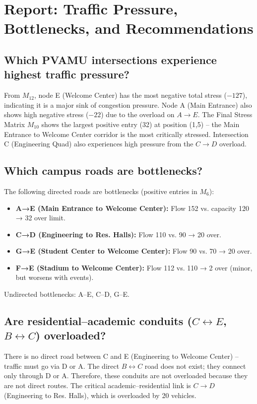 \documentclass{ximera}
\begin{document}
\newpage

\section*{Report: Traffic Pressure, Bottlenecks, and Recommendations}

\subsection*{Which PVAMU intersections experience highest traffic pressure?}
From \(M_{12}\), node E (Welcome Center) has the most negative total stress (\(-127\)), indicating it is a major sink of congestion pressure. Node A (Main Entrance) also shows high negative stress (\(-22\)) due to the overload on \(A\rightarrow E\). The Final Stress Matrix \(M_{10}\) shows the largest positive entry (32) at position (1,5) – the Main Entrance to Welcome Center corridor is the most critically stressed. Intersection C (Engineering Quad) also experiences high pressure from the \(C\rightarrow D\) overload.

\subsection*{Which campus roads are bottlenecks?}
The following directed roads are bottlenecks (positive entries in \(M_6\)):
\begin{itemize}
    \item \textbf{A→E (Main Entrance to Welcome Center):} Flow 152 vs. capacity 120 → 32 over limit.
    \item \textbf{C→D (Engineering to Res. Halls):} Flow 110 vs. 90 → 20 over.
    \item \textbf{G→E (Student Center to Welcome Center):} Flow 90 vs. 70 → 20 over.
    \item \textbf{F→E (Stadium to Welcome Center):} Flow 112 vs. 110 → 2 over (minor, but worsens with events).
\end{itemize}
Undirected bottlenecks: A–E, C–D, G–E.

\subsection*{Are residential–academic conduits (\(C\leftrightarrow E\), \(B\leftrightarrow C\)) overloaded?}
There is no direct road between C and E (Engineering to Welcome Center) – traffic must go via D or A. The direct \(B\leftrightarrow C\) road does not exist; they connect only through D or A. Therefore, these conduits are not overloaded because they are not direct routes. The critical academic–residential link is \(C\rightarrow D\) (Engineering to Res. Halls), which is overloaded by 20 vehicles.
\end{document}
